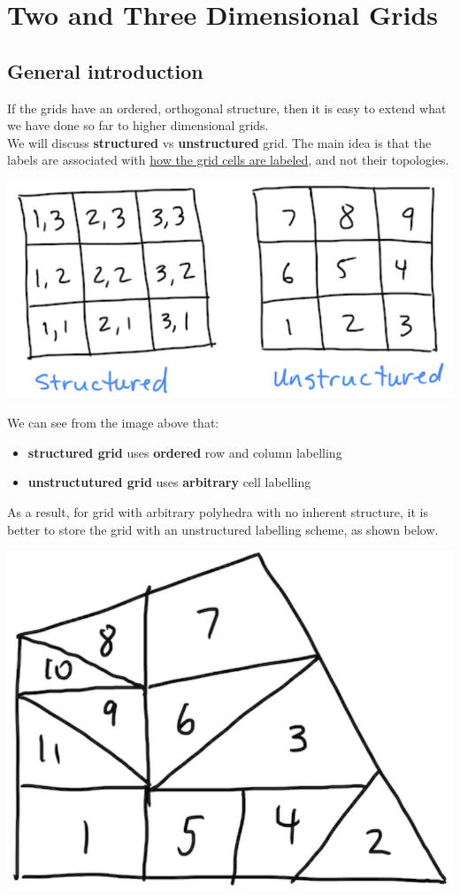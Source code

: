 \documentclass[11pt]{article}
\date{\today}
\title{}
\begin{document}
\tableofcontents

\section{Two and Three Dimensional Grids}
\label{sec:org0078255}
\subsection{General introduction}
\label{sec:orgdc371e4}
If the grids have an ordered, orthogonal structure, then it is easy to extend what we have done so
far to higher dimensional grids. \\
We will discuss \textbf{structured} vs \textbf{unstructured} grid. The main idea is
that the labels are associated with \uline{how the grid cells are labeled}, and not their topologies.

\begin{center}
\includegraphics[scale=0.4]{../pic/grid.png}
\end{center}
We can see from the image above that:
\begin{itemize}
\item \textbf{structured grid} uses \textbf{ordered} row and column labelling
\item \textbf{unstructutured grid} uses \textbf{arbitrary} cell labelling
\end{itemize}
As a result, for grid with arbitrary polyhedra with no inherent structure, it is better to store
the grid with an unstructured labelling scheme, as shown below.
\begin{center}
\includegraphics[scale=0.4]{../pic/polyhedra_unstructured.png}
\end{center}
\end{document}

